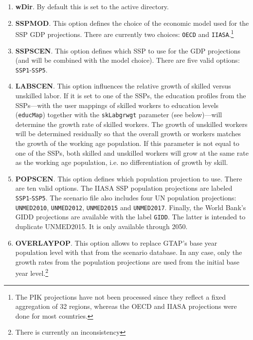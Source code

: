 \begin{enumerate}
   \item \textbf{wDir}. By default this is set to the active directory.
   \item \textbf{SSPMOD}. This option defines the choice of the economic model
         used for the SSP GDP projections. There are currently two choices:
         \texttt{OECD} and \texttt{IIASA}.\footnote{The PIK projections have not
         been processed since they reflect a fixed aggregation of 32 regions,
         whereas the OECD and IIASA projections were done for most countries.}
   \item \textbf{SSPSCEN}. This option defines which SSP to use for the GDP
         projections (and will be combined with the model choice). There are
         five valid options: \texttt{SSP1}-\texttt{SSP5}.
   \item \textbf{LABSCEN}. This option influences the relative growth of skilled
         versus unskilled labor. If it is set to one of the SSPs, the education
         profiles from the SSPs---with the user mappings of skilled workers to
         education levels (\texttt{educMap}) together with the \texttt{skLabgrwgt}
         parameter (see below)---will
         determine the growth rate of skilled workers. The growth of unskilled
         workers will be determined residually so that the overall growth or
         workers matches the growth of the working age population. If this
         parameter is not equal to one of the SSPs, both skilled and unskilled
         workers will grow at the same rate as the working age population,
         i.e. no differentiation of growth by skill.
   \item \textbf{POPSCEN}. This option defines which population projection to
         use. There are ten valid options. The IIASA SSP population projections
         are labeled \texttt{SSP1}-\texttt{SSP5}. The scenario file also
         includes four UN population projections: \texttt{UNMED2010},
         \texttt{UNMED2012}, \texttt{UNMED2015} and \texttt{UNMED2017}. Finally, the World Bank's
         GIDD projections are available with the label \texttt{GIDD}. The latter
         is intended to duplicate UNMED2015. It is only available through 2050.
   \item \textbf{OVERLAYPOP}. This option allows to replace GTAP's base year
         population level with that from the scenario database. In any case,
         only the growth rates from the population projections are used from the
         initial base year level.\footnote{There is currently an inconsistency
}
\end{enumerate}
